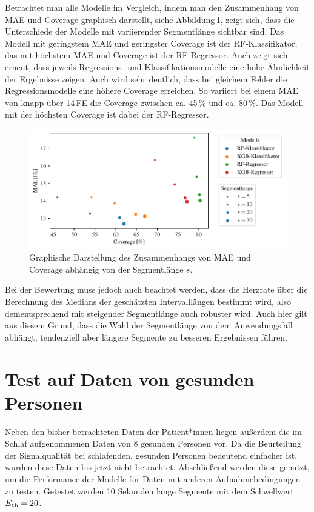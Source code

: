  Betrachtet man alle Modelle im Vergleich, indem man den Zusammenhang von \ac{MAE} und Coverage graphisch darstellt, siehe Abbildung\,\ref{fig:segment-length-variation}, zeigt sich, dass die Unterschiede der Modelle mit variierender Segmentlänge sichtbar sind. Das Modell mit geringstem \ac{MAE} und geringster Coverage ist der \ac{RF}-Klassifikator, das mit höchstem \ac{MAE} und Coverage ist der \ac{RF}-Regressor. Auch zeigt sich erneut, dass jeweils Regressions- und Klassifikationsmodelle eine hohe Ähnlichkeit der Ergebnisse zeigen. Auch wird sehr deutlich, dass bei gleichem Fehler die Regressionsmodelle eine höhere Coverage erreichen. So variiert bei einem \ac{MAE} von knapp über 14\,\si{FE} die Coverage zwischen ca. 45\,\% und ca. 80\,\%. Das Modell mit der höchsten Coverage ist dabei der \ac{RF}-Regressor.
 
 \begin{figure}[H]
	\centering
	\includegraphics[scale=0.95]{pic/segment-length-variation.pdf}
 	\caption{Graphische Darstellung des Zusammenhangs von \ac{MAE} und Coverage abhängig von der Segmentlänge $s$.}
 	\label{fig:segment-length-variation}
\end{figure}

 Bei der Bewertung muss jedoch auch beachtet werden, dass die Herzrate über die Berechnung des Medians der geschätzten Intervalllängen bestimmt wird, also dementsprechend mit steigender Segmentlänge auch robuster wird. Auch hier gilt aus diesem Grund, dass die Wahl der Segmentlänge von dem Anwendungsfall abhängt, tendenziell aber längere Segmente zu besseren Ergebnissen führen.

\section{Test auf Daten von gesunden Personen}

Neben den bisher betrachteten Daten der Patient*innen liegen außerdem die im Schlaf aufgenommenen Daten von 8 gesunden Personen vor. Da die Beurteilung der Signalqualität bei schlafenden, gesunden Personen bedeutend einfacher ist, wurden diese Daten bis jetzt nicht betrachtet. Abschließend werden diese genutzt, um die Performance der Modelle für Daten mit anderen Aufnahmebedingungen zu testen. Getestet werden 10 Sekunden lange Segmente mit dem Schwellwert $E\textsubscript{th} = 20$.

